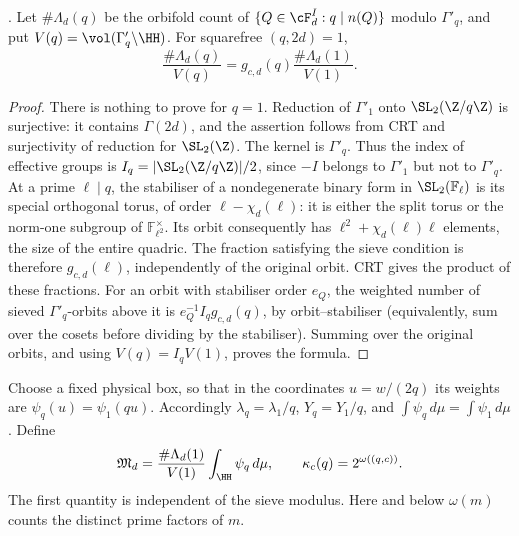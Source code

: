 \begin{lemma}\label{L:6.1}
. Let \(\#\Lambda_d(q)\) be the orbifold count of
\(\{Q\in\cF_d^I:q\mid n(Q)\}\) modulo \(\Gamma'_q\), and put
\(V(q)=\vol(\Gamma'_q\backslash\HH)\). For squarefree \((q,2d)=1\),
\[
 \frac{\#\Lambda_d(q)}{V(q)}
 =g_{c,d}(q)\frac{\#\Lambda_d(1)}{V(1)}.
\]
\end{lemma}
\begin{proof}
There is nothing to prove for \(q=1\). Reduction of \(\Gamma'_1\)
onto \(\SL_2(\Z/q\Z)\) is surjective: it contains \(\Gamma(2d)\),
and the assertion follows from CRT and surjectivity of reduction for
\(\SL_2(\Z)\). The kernel is \(\Gamma'_q\). Thus the index of effective
groups is
\(I_q=|\SL_2(\Z/q\Z)|/2\), since \(-I\) belongs to \(\Gamma'_1\)
but not to \(\Gamma'_q\).
At a prime \(\ell\mid q\), the stabiliser of a nondegenerate binary form
in \(\SL_2(\mathbb F_\ell)\) is its special orthogonal torus, of order
\(\ell-\chi_d(\ell)\): it is either the split torus or the norm-one
subgroup of \(\mathbb F_{\ell^2}^{\times}\).
Its orbit consequently has \(\ell^2+\chi_d(\ell)\ell\) elements, the
size of the entire quadric. The fraction satisfying the sieve condition
is therefore \(g_{c,d}(\ell)\), independently of the original orbit.
CRT gives the product of these fractions.
For an orbit with stabiliser order \(e_Q\), the weighted number of
sieved \(\Gamma'_q\)-orbits above it is
\(e_Q^{-1}I_qg_{c,d}(q)\), by orbit--stabiliser (equivalently, sum over
the cosets before dividing by the stabiliser). Summing over the original
orbits, and using \(V(q)=I_qV(1)\), proves the formula.
\end{proof}

Choose a fixed physical box, so that in the coordinates \(u=w/(2q)\)
its weights are \(\psi_q(u)=\psi_1(qu)\). Accordingly
\(\lambda_q=\lambda_1/q\), \(Y_q=Y_1/q\), and
\(\int\psi_q\,d\mu=\int\psi_1\,d\mu\). Define
\[
 \mathfrak M_d=\frac{\#\Lambda_d(1)}{V(1)}\int_{\HH}\psi_q\,d\mu,
 \qquad \kappa_c(q)=2^{\omega((q,c))}.
\]
The first quantity is independent of the sieve modulus. Here and below
\(\omega(m)\) counts the distinct prime factors of \(m\).

